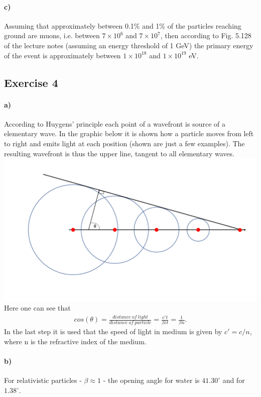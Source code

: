 \documentclass{article}
\begin{document}
\paragraph{c)}
Assuming that approximately between 0.1\% and 1\% of the particles reaching ground are muons, i.e. between $7\times 10^6$ and $7\times 10^7$, then according to Fig. 5.128 of the lecture notes (assuming an energy threshold of 1 GeV) the primary energy of the event is approximately between $1\times 10^{18}$ and $1\times 10^{19}$ eV.

\subsection*{Exercise 4}
\paragraph{a)}
According to Huygens' principle each point of a wavefront is source of a elementary wave. 
In the graphic below it is shown how a particle moves from left to right and emits light at each position (shown are just a few examples). 
The resulting wavefront is thus the upper line, tangent to all elementary waves. \\
\includegraphics[width=\textwidth]{exercise4.png}\\
Here one can see that 
\begin{align*}
cos(\theta) = \frac{distance\ of\ light}{distance\ of\ particle} = \frac{c't}{\beta c t} = \frac{1}{\beta n}.
\end{align*}
In the last step it is used that the speed of light in medium is given by $c' = c / n$, where n is the refractive index of the medium.

\paragraph{b)}
For relativistic particles - $\beta \approx 1$ - the opening angle for water is $41.30^\circ$ and for $1.38^\circ$.
\end{document}
